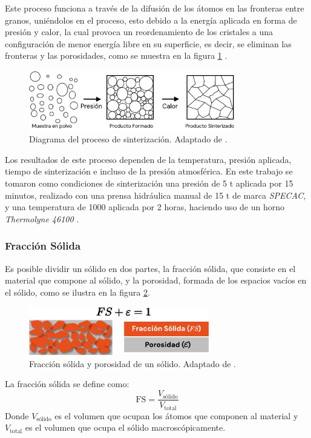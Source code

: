 \documentclass[../main.tex]{subfiles}
\begin{document}
Este proceso funciona a través de la difusión de los átomos en las fronteras entre granos, uniéndolos en el proceso, esto debido a la energía aplicada en forma de presión y calor, la cual provoca un reordenamiento de los cristales a una configuración de menor energía libre en su superficie, es decir, se eliminan las fronteras y las porosidades, como se muestra en la figura \ref{fig:sintdiag} \cite{Ou2014}.
\begin{figure}[H]
    \centering
    \includegraphics[width=0.8\textwidth]{fig/sintdiag.jpg}
    \caption{Diagrama del proceso de sinterización. Adaptado de \cite{Ou2014}.}
    \label{fig:sintdiag}
\end{figure}

Los resultados de este proceso dependen de la temperatura, presión aplicada, tiempo de sinterización e incluso de la presión atmosférica. En este trabajo se tomaron como condiciones de sinterización una presión de 5 t aplicada por 15 minutos, realizado con una prensa hidráulica manual de 15 t de marca \textit{SPECAC}, y una temperatura de 1000\gradoC{} aplicada por 2 horas, haciendo uso de un horno \textit{Thermolyne 46100} \cite{Aparnadevi2016}.

\subsubsection{Fracción Sólida}
Es posible dividir un sólido en dos partes, la fracción sólida, que consiste en el material que compone al sólido, y la porosidad, formada de los espacios vacíos en el sólido, como se ilustra en la figura \ref{fig:fracsolida}. 
\begin{figure}[H]
    \centering
    \includegraphics[width=0.7\textwidth]{fig/fracsolida.jpg}
    \caption{Fracción sólida y porosidad de un sólido. Adaptado de \cite{Erklaert2024}.}
    \label{fig:fracsolida}
\end{figure}
La fracción sólida se define como:
\begin{equation}
    \text{FS}=\dfrac{V_\text{sólido}}{V_\text{total}}
    \label{eq:fracsolida}
\end{equation}
Donde $V_\text{sólido}$ es el volumen que ocupan los átomos que componen al material y $V_\text{total}$ es el volumen que ocupa el sólido macroscópicamente.
\end{document}
